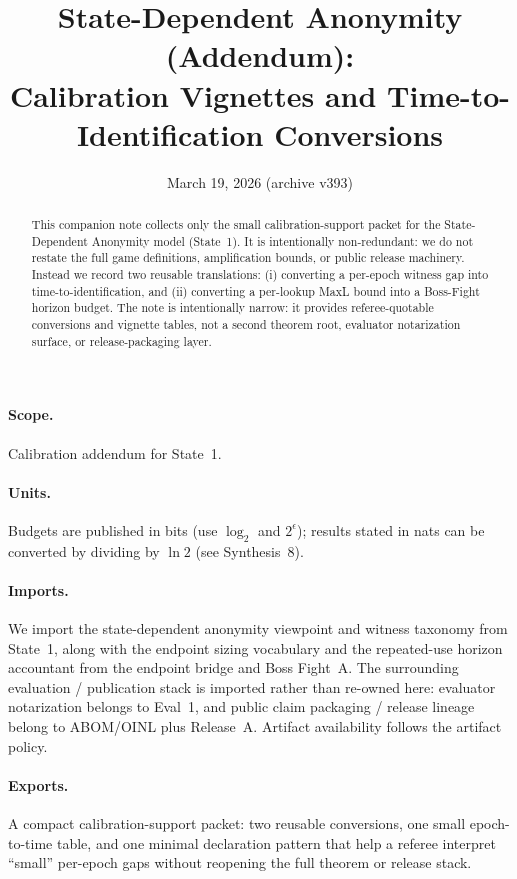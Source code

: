 \documentclass[11pt]{article}
\title{State-Dependent Anonymity (Addendum):\\Calibration Vignettes and Time-to-Identification Conversions}
\author{}
\date{March 19, 2026 (archive v393)}
\theoremstyle{definition}
\theoremstyle{remark}
\begin{document}
\maketitle

\begin{abstract}
This companion note collects only the small calibration-support packet for the State-Dependent Anonymity model (State~1).
It is intentionally non-redundant: we do not restate the full game definitions, amplification bounds, or public release machinery.
Instead we record two reusable translations:
(i) converting a per-epoch witness gap into time-to-identification, and
(ii) converting a per-lookup MaxL bound into a Boss-Fight horizon budget.
The note is intentionally narrow: it provides referee-quotable conversions and vignette tables, not a second theorem root, evaluator notarization surface, or release-packaging layer.
\end{abstract}

\paragraph{Scope.}
Calibration addendum for State~1.\cite{series:state1}

\paragraph{Units.} Budgets are published in bits (use $\log_2$ and $2^{\epsilon}$); results stated in nats can be converted by dividing by $\ln 2$ (see Synthesis~8).\cite{series:notation}

\paragraph{Imports.}
We import the state-dependent anonymity viewpoint and witness taxonomy from State~1, along with the endpoint sizing vocabulary and the repeated-use horizon accountant from the endpoint bridge and Boss Fight~A.\cite{series:state1,series:endpointbridge,series:bossfightA}
The surrounding evaluation / publication stack is imported rather than re-owned here: evaluator notarization belongs to Eval~1, and public claim packaging / release lineage belong to ABOM/OINL plus Release~A.\cite{series:evalnotary,series:abomoinl,series:releaseproperty}
Artifact availability follows the artifact policy.\cite{series:artifactpolicy}

\paragraph{Exports.}
A compact calibration-support packet: two reusable conversions, one small epoch-to-time table, and one minimal declaration pattern that help a referee interpret ``small'' per-epoch gaps without reopening the full theorem or release stack.
\end{document}
